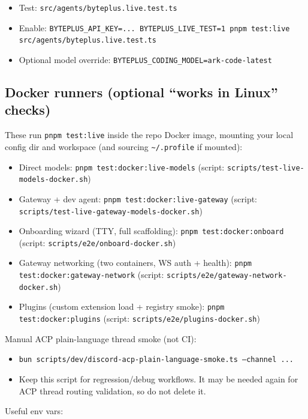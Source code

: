 \begin{itemize}
  \item Test: \texttt{src/agents/byteplus.live.test.ts}
  \item Enable: \texttt{BYTEPLUS\_API\_KEY=... BYTEPLUS\_LIVE\_TEST=1 pnpm test:live src/agents/byteplus.live.test.ts}
  \item Optional model override: \texttt{BYTEPLUS\_CODING\_MODEL=ark-code-latest}
\end{itemize}


\subsection{Docker runners (optional “works in Linux” checks)}


These run \texttt{pnpm test:live} inside the repo Docker image, mounting your local config dir and workspace (and sourcing \texttt{\textasciitilde{}/.profile} if mounted):

\begin{itemize}
  \item Direct models: \texttt{pnpm test:docker:live-models} (script: \texttt{scripts/test-live-models-docker.sh})
  \item Gateway + dev agent: \texttt{pnpm test:docker:live-gateway} (script: \texttt{scripts/test-live-gateway-models-docker.sh})
  \item Onboarding wizard (TTY, full scaffolding): \texttt{pnpm test:docker:onboard} (script: \texttt{scripts/e2e/onboard-docker.sh})
  \item Gateway networking (two containers, WS auth + health): \texttt{pnpm test:docker:gateway-network} (script: \texttt{scripts/e2e/gateway-network-docker.sh})
  \item Plugins (custom extension load + registry smoke): \texttt{pnpm test:docker:plugins} (script: \texttt{scripts/e2e/plugins-docker.sh})
\end{itemize}


Manual ACP plain-language thread smoke (not CI):

\begin{itemize}
  \item \texttt{bun scripts/dev/discord-acp-plain-language-smoke.ts --channel  ...}
  \item Keep this script for regression/debug workflows. It may be needed again for ACP thread routing validation, so do not delete it.
\end{itemize}


Useful env vars:


